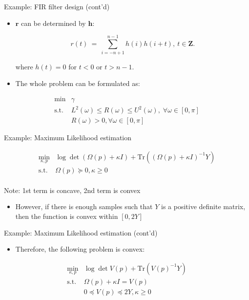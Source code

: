 \documentclass[10pt,ignorenonframetext,serif,onlymath]{beamer}
\providecommand{\tightlist}{%
  \setlength{\itemsep}{0pt}\setlength{\parskip}{0pt}}
\begin{document}
\begin{frame}{Example: FIR filter design (cont’d)}
\protect\hypertarget{sec:example-fir-filter-design-contd-2}{}

\begin{itemize}
\item
  \(\mathbf{r}\) can be determined by \(\mathbf{h}\):

  \[r(t)~=~\sum_{i=-n+1}^{n-1}{h(i)h(i+t)},~t\in\mathbf{Z}.\]

  where \(h(t)=0\) for \(t < 0\) or \(t > n-1\).
\item
  The whole problem can be formulated as:
\end{itemize}

\[\begin{array}{ll}
  \text{min}  & \gamma \\
  \text{s.t.} & L^2(\omega) \leq R(\omega) \leq U^2(\omega), \; \forall \omega \in [0,\pi]   \\
              & R(\omega) > 0, \forall \omega \in [0,\pi]
\end{array}\]

\end{frame}

\begin{frame}{Example: Maximum Likelihood estimation}
\protect\hypertarget{sec:example-maximum-likelihood-estimation}{}

\[\begin{array}{ll}
      \min_{\kappa, p}   &      \log \det (\Omega(p) + \kappa I) + \mathrm{Tr}((\Omega(p) + \kappa I)^{-1}Y) \\
      \text{s.t.} & \Omega(p) \succeq 0, \kappa \geq 0 \\
 \end{array}\]

Note: 1st term is concave, 2nd term is convex

\begin{itemize}
\tightlist
\item
  However, if there is enough samples such that \(Y\) is a positive
  definite matrix, then the function is convex within \([0, 2Y]\)
\end{itemize}

\end{frame}

\begin{frame}{Example: Maximum Likelihood estimation (cont’d)}
\protect\hypertarget{sec:example-maximum-likelihood-estimation-contd}{}

\begin{itemize}
\tightlist
\item
  Therefore, the following problem is convex:
\end{itemize}

\[\begin{array}{ll}
      \min_{\kappa, p}   &   \log \det V(p) + \mathrm{Tr}(V(p)^{-1}Y) \\
      \text{s.t.} & \Omega(p) + \kappa I = V(p) \\
                    & 0 \preceq V(p) \preceq 2Y, \kappa \geq 0
\end{array}\]

\end{frame}
\end{document}
